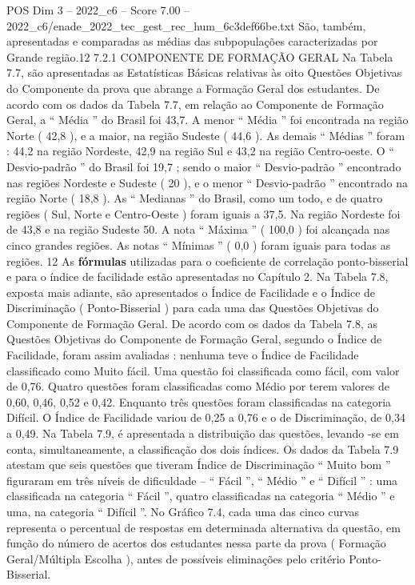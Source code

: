\begin{textsample}{POS Dim 3 – 2022\_c6 – Score 7.00 – 2022\_c6/enade\_2022\_tec\_gest\_rec\_hum\_6c3def66be.txt}
São, também, apresentadas e comparadas as médias das subpopulações caracterizadas por Grande região.12 7.2.1 COMPONENTE DE FORMAÇÃO GERAL Na Tabela 7.7, são apresentadas as Estatísticas Básicas relativas às oito Questões Objetivas do Componente da prova que abrange a Formação Geral dos estudantes.
De acordo com os dados da Tabela 7.7, em relação ao Componente de Formação Geral, a “ Média ” do Brasil foi 43,7.
A menor “ Média ” foi encontrada na região Norte ( 42,8 ), e a maior, na região Sudeste ( 44,6 ).
As demais “ Médias ” foram : 44,2 na região Nordeste, 42,9 na região Sul e 43,2 na região Centro-oeste.
O “ Desvio-padrão ” do Brasil foi 19,7 ; sendo o maior “ Desvio-padrão ” encontrado nas regiões Nordeste e Sudeste ( 20 ), e o menor “ Desvio-padrão ” encontrado na região Norte ( 18,8 ).
As “ Medianas ” do Brasil, como um todo, e de quatro regiões ( Sul, Norte e Centro-Oeste ) foram iguais a 37,5.
Na região Nordeste foi de 43,8 e na região Sudeste 50.
A nota “ Máxima ” ( 100,0 ) foi alcançada nas cinco grandes regiões.
As notas “ Mínimas ” ( 0,0 ) foram iguais para todas as regiões. 12 As \textbf{fórmulas} utilizadas para o coeficiente de correlação ponto-bisserial e para o índice de facilidade estão apresentadas no Capítulo 2.
Na Tabela 7.8, exposta mais adiante, são apresentados o Índice de Facilidade e o Índice de Discriminação ( Ponto-Bisserial ) para cada uma das Questões Objetivas do Componente de Formação Geral.
De acordo com os dados da Tabela 7.8, as Questões Objetivas do Componente de Formação Geral, segundo o Índice de Facilidade, foram assim avaliadas : nenhuma teve o Índice de Facilidade classificado como Muito fácil.
Uma questão foi classificada como fácil, com valor de 0,76.
Quatro questões foram classificadas como Médio por terem valores de 0,60, 0,46, 0,52 e 0,42.
Enquanto três questões foram classificadas na categoria Difícil.
O Índice de Facilidade variou de 0,25 a 0,76 e o de Discriminação, de 0,34 a 0,49.
Na Tabela 7.9, é apresentada a distribuição das questões, levando -se em conta, simultaneamente, a classificação dos dois índices.
Os dados da Tabela 7.9 atestam que seis questões que tiveram Índice de Discriminação “ Muito bom ” figuraram em três níveis de dificuldade – “ Fácil ”, “ Médio ” e “ Difícil ” : uma classificada na categoria “ Fácil ”, quatro classificadas na categoria “ Médio ” e uma, na categoria “ Difícil ”.
No Gráfico 7.4, cada uma das cinco curvas representa o percentual de respostas em determinada alternativa da questão, em função do número de acertos dos estudantes nessa parte da prova ( Formação Geral/Múltipla Escolha ), antes de possíveis eliminações pelo critério Ponto-Bisserial.

\end{textsample}
